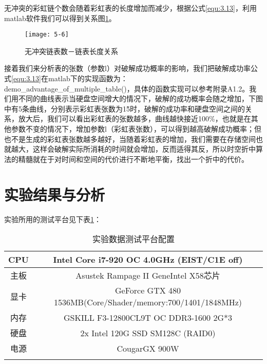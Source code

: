 无冲突的彩虹链个数会随着彩虹表的长度增加而减少，根据公式\eqref{equ:3.13}，利用matlab软件我们可以得到关系图\ref{fig:5.6}。
\begin{figure}[!ht]
\centering
\texttt{[image: 5-6]}
\caption{无冲突链表数－链表长度关系}
\label{fig:5.6}
\end{figure}

接着我们来分析表的张数（参数l）对破解成功概率的影响，我们把破解成功率公式\eqref{equ:3.13}在matlab下的实现函数为：\\
demo\_advantage\_of\_multiple\_table()，具体的函数实现可以参考附录A1.2。我们用不同的曲线表示当硬盘空间增大的情况下，破解的成功概率会随之增加，下图中有5条曲线，分别表示彩虹表张数为1\~5时，破解的成功率和硬盘空间之间的关系，放大后，我们可以看出彩虹表的张数越多，曲线越快接近100\%，也就是在其他参数不变的情况下，增加参数l（彩虹表张数），可以得到越高破解成功概率；但也不是生成的彩虹表张数越多越好，当随着彩虹表的增加，我们需要在存储空间也就越大，这样会破解实际所消耗的时间就会增加，反而适得其反，所以时空折中算法的精髓就在于对时间和空间的代价进行不断地平衡，找出一个折中的代价。
\begin{figure}[!h]
\begin{floatrow}
\end{floatrow}
\end{figure}
\begin{figure}[!h]
\begin{floatrow}
\end{floatrow}
\end{figure}
\clearpage
\section{实验结果与分析}
实验所用的测试平台见下表\ref{tab:5.3}：
\begin{longtable}{@{\extracolsep{\fill}}cc}
\caption{实验数据测试平台配置}\\\toprule[1pt]
\multicolumn{1}{c}{CPU} & \multicolumn{1}{c}{Intel Core i7-920 OC 4.0GHz (EIST/C1E off)} \\\hline
主板 & Asustek Rampage II GeneIntel X58芯片 \\\hline
显卡 & GeForce GTX 480 1536MB(Core/Shader/memory:700/1401/1848MHz) \\\hline
内存 & GSKILL F3-12800CL9T OC DDR3-1600 2G*3 \\\hline
硬盘 & 2x Intel 120G SSD SM128C (RAID0) \\\hline
电源 &  CougarGX 900W  \\
\bottomrule[1pt]
\label{tab:5.3}
\end{longtable}
